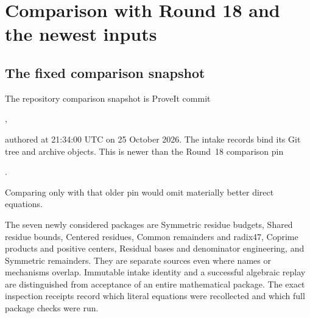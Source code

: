 \section{Comparison with Round 18 and the newest inputs}
\label{sec:comparison}
\subsection{The fixed comparison snapshot}
The repository comparison snapshot is ProveIt commit
\begin{center}\small
{},
\end{center}
authored at 21:34:00 UTC on 25 October 2026. The intake records bind its
Git tree and archive objects. This is newer than the Round~18 comparison
pin
\begin{center}\small
{}.
\end{center}
Comparing only with that older pin would omit materially better direct equations.

The seven newly considered packages are Symmetric residue budgets, Shared
residue bounds, Centered residues, Common remainders and radix47, Coprime
products and positive centers, Residual bases and denominator engineering,
and Symmetric remainders. They are separate sources even where names or
mechanisms overlap. Immutable intake identity and a successful algebraic
replay are distinguished from acceptance of an entire mathematical package.
The exact inspection receipts record which literal equations were recollected
and which full package checks were run.


